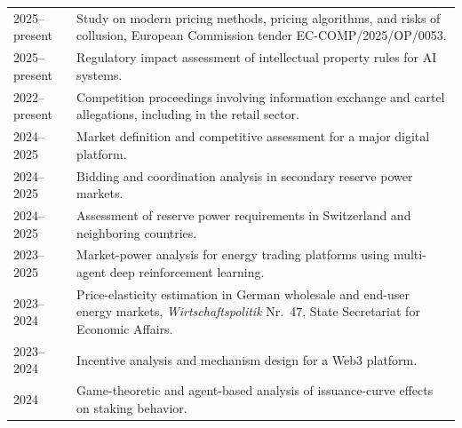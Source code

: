 \documentclass[11pt,a4paper]{article}
\makeatletter
\newenvironment{cvtable}{
    \begin{longtable}{@{}L{0.18\textwidth}L{0.79\textwidth}@{}}
}{
    \end{longtable}
}
\newcommand{\cvitem}[2]{#1 & #2 \\[0.45em]}
\makeatother
\begin{document}
\begin{cvtable}
\cvitem{2025--present}{Study on modern pricing methods, pricing algorithms, and risks of collusion, European Commission tender EC-COMP/2025/OP/0053.}

\cvitem{2025--present}{Regulatory impact assessment of intellectual property rules for AI systems.}

\cvitem{2022--present}{Competition proceedings involving information exchange and cartel allegations, including in the retail sector.}

\cvitem{2024--2025}{Market definition and competitive assessment for a major digital platform.}

\cvitem{2024--2025}{Bidding and coordination analysis in secondary reserve power markets.}

\cvitem{2024--2025}{Assessment of reserve power requirements in Switzerland and neighboring countries.}

\cvitem{2023--2025}{Market-power analysis for energy trading platforms using multi-agent deep reinforcement learning.}

\cvitem{2023--2024}{Price-elasticity estimation in German wholesale and end-user energy markets, \textit{Wirtschaftspolitik} Nr.~47, State Secretariat for Economic Affairs.}

\cvitem{2023--2024}{Incentive analysis and mechanism design for a Web3 platform.}

\cvitem{2024}{Game-theoretic and agent-based analysis of issuance-curve effects on staking behavior.}

\end{cvtable}
\end{document}
